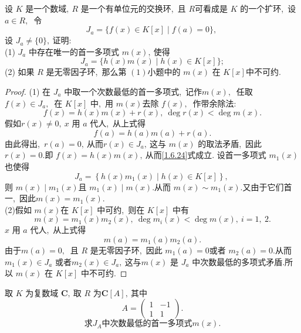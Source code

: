 \newpage
\begin{problem}
	设  $K$  是一个数域$,\   R $ 是一个有单位元的交换环,\  且 $ R  $可看成是  $K $ 的一个扩环,\  设 $ a \in R ,\ $ 令
	$$J_{a}=\{f(x) \in K[x] \mid f(a)=0\},\ $$
	设 $ J_{a} \neq\{0\} ,\  $证明:\\
	(1)  $J_{a}$  中存在唯一的首一多项式 $ m(x) ,\  $使得
	\begin{equation}
		J_{a}=\{h(x) m(x) \mid h(x) \in K[x]\} ;\label{1.6.24}
	\end{equation}
	(2) 如果  $R $ 是无零因子环,\  那么第 $(1) $小题中的 $ m(x) $ 在 $ K[x]  $中不可约.
\end{problem}
\begin{proof}
	(1) 在 $ J_{a}$  中取一个次数最低的首一多项式,\  记作$  m(x) ,\ $ 任取 $ f(x) \in J_{a} ,\ $ 在 $ K[x] $ 中,\  用 $ m(x)  $去除  $f(x) ,\ $ 作带余除法:
	$$f(x)=h(x) m(x)+r(x),\  \operatorname{deg} r(x)<\operatorname{deg} m(x) .$$
	假如$  r(x) \neq 0,\  x $ 用 $ a$  代人,\  从上式得
	$$f(a)=h(a) m(a)+r(a) .$$
	由此得出,\  $ r(a)=0 ,\  $从而$  r(x) \in J_{a} ,\  $这与 $ m(x) $ 的取法矛盾,\  因此$  r(x)=0  .$即 $ f(x)=   h(x) m(x) ,\  $从而\eqref{1.6.24}式成立.
	设首一多项式  $m_{1}(x) $ 也使得
	$$J_{a}=\left\{h(x) m_{1}(x) \mid h(x) \in K[x]\right\},\ $$
	则 $ m(x) \mid m_{1}(x)  $且 $ m_{1}(x) \mid m(x)  .$从而 $ m(x) \sim m_{1}(x)  .$又由于它们首一,\  因此$  m(x)=m_{1}(x)  .$\\
	(2)假如  $m(x)  $在 $ K[x] $ 中可约,\  则在 $ K[x] $ 中有
	$$m(x)=m_{1}(x) m_{2}(x),\  \operatorname{deg} m_{i}(x)<\operatorname{deg} m(x),\  i=1,\ 2.$$
	$x$  用  $a $ 代人,\  从上式得
	$$m(a)=m_{1}(a) m_{2}(a) .$$
	由于$  m(a)=0 ,\ $ 且 $ R $ 是无零因子环,\  因此 $ m_{1}(a)=0  $或者  $m_{2}(a)=0  .$从而$  m_{1}(x) \in J_{a} $ 或者$  m_{2}(x) \in J_{a} ,\  $这与$  m(x) $ 是 $ J_{a} $ 中次数最低的多项式矛盾.所以 $ m(x) $ 在 $ K[x] $ 中不可约.
\end{proof}
\newpage
\begin{problem}
	取  $K $ 为复数域 $ \mathbf{C} ,\  $取  $R$  为$  \mathbf{C}[A] ,\  $其中
	$$A=\left(\begin{array}{cc}
		1 & -1 \\
		1 & 1
	\end{array}\right).$$
	$$求  J_{A}  中次数最低的首一多项式  m(x)  .$$
\end{problem}
